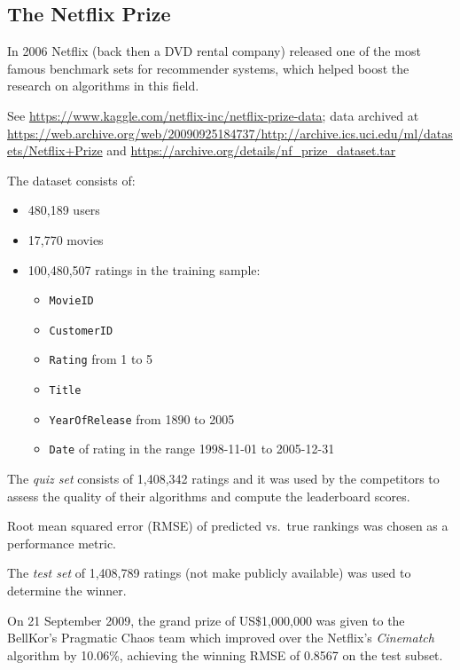 \documentclass[10pt,b5paper,krantz1]{krantz}
\providecommand{\tightlist}{%
  \setlength{\itemsep}{0pt}\setlength{\parskip}{0pt}}
\begin{document}
\hypertarget{the-netflix-prize}{%
\subsection{The Netflix Prize}\label{the-netflix-prize}}

In 2006 Netflix (back then a DVD rental company) released one of the most famous
benchmark sets for recommender systems, which helped boost the research
on algorithms in this field.

See \url{https://www.kaggle.com/netflix-inc/netflix-prize-data};
data archived at
\url{https://web.archive.org/web/20090925184737/http://archive.ics.uci.edu/ml/datasets/Netflix+Prize}
and \url{https://archive.org/details/nf_prize_dataset.tar}

The dataset consists of:

\begin{itemize}
\tightlist
\item
  480,189 users
\item
  17,770 movies
\item
  100,480,507 ratings in the training sample:

  \begin{itemize}
  \tightlist
  \item
    \texttt{MovieID}
  \item
    \texttt{CustomerID}
  \item
    \texttt{Rating} from 1 to 5
  \item
    \texttt{Title}
  \item
    \texttt{YearOfRelease} from 1890 to 2005
  \item
    \texttt{Date} of rating in the range 1998-11-01 to 2005-12-31
  \end{itemize}
\end{itemize}

The \emph{quiz set} consists of 1,408,342 ratings
and it was used by the competitors to assess the quality of their
algorithms and compute the leaderboard scores.

Root mean squared error (RMSE) of predicted vs.~true rankings was chosen as a
performance metric.

The \emph{test set} of 1,408,789 ratings (not make publicly available)
was used to determine the winner.

On 21 September 2009, the grand prize of US\$1,000,000 was given
to the BellKor's Pragmatic Chaos team which improved over
the Netflix's \emph{Cinematch} algorithm by 10.06\%,
achieving the winning RMSE of 0.8567 on the test subset.
\end{document}
